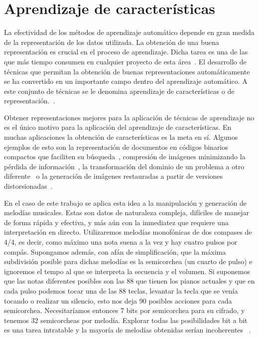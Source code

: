 
\chapter{Aprendizaje de características}

La efectividad de los métodos de aprendizaje automático depende en gran medida de la representación de los datos utilizada. La obtención de una buena representación es crucial en el proceso de aprendizaje. Dicha tarea es una de las que más tiempo consumen en cualquier proyecto de esta área~\cite{domingos2012few}. El desarrollo de técnicas que permitan la obtención de buenas representaciones automáticamente se ha convertido en un importante campo dentro del aprendizaje automático. A este conjunto de técnicas se le denomina aprendizaje de características o de representación.~\cite{bengio2013representation}.

Obtener representaciones mejores para la aplicación de técnicas de aprendizaje no es el único motivo para la aplicación del aprendizaje de características. En muchas aplicaciones la obtención de características es la meta en sí. Algunos ejemplos de esto son la representación de documentos en códigos binarios compactos que faciliten su búsqueda~\cite{salakhutdinov2009semantic}, compresión de imágenes minimizando la pérdida de información~\cite{theis2017lossy}, la transformación del dominio de un problema a otro diferente~\cite{deng2013sparse} o la generación de imágenes restauradas a partir de versiones distorsionadas~\cite{xie2012image}.

En el caso de este trabajo se aplica esta idea a la manipulación y generación de melodías musicales. Estas son datos de naturaleza compleja, difíciles de manejar de forma rápida y efectiva, y más aún con la inmediatez que requiere una interpretación en directo. Utilizaremos melodías monofónicas de dos compases de 4/4, es decir, como máximo una nota suena a la vez y hay cuatro pulsos por compás. Supongamos además, con afán de simplificación, que la máxima subdivisión posible para dichas melodías es la semicorchea (un cuarto de pulso) e ignoremos el tempo al que se interpreta la secuencia y el volumen. Si suponemos que las notas diferentes posibles son las 88 que tienen los pianos actuales y que en cada pulso podemos tocar una de las 88 teclas, levantar la tecla que se venía tocando o realizar un silencio, esto nos deja 90 posibles acciones para cada semicorchea. Necesitaríamos entonces 7 bits por semicorchea para su cifrado, y tenemos 32 semicorcheas por melodía. Explorar todas las posibilidades bit a bit es una tarea intratable y la mayoría de melodías obtenidas serían incoherentes ~\cite{roberts2018learning}.

